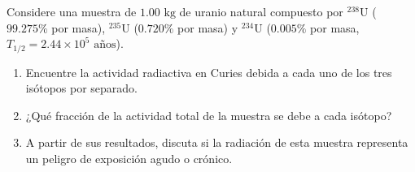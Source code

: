 \item Considere una muestra de $1.00\text{ kg}$ de uranio natural compuesto por $^{238}\text{U}$ ($99.275\%$ por masa), $^{235}\text{U}$ ($0.720\%$ por masa) y $^{234}\text{U}$ ($0.005\%$ por masa, $T_{1/2} = 2.44 \times 10^5\text{ años}$).
\begin{enumerate}
    \item Encuentre la actividad radiactiva en Curies debida a cada uno de los tres isótopos por separado.
    \item ¿Qué fracción de la actividad total de la muestra se debe a cada isótopo?
    \item A partir de sus resultados, discuta si la radiación de esta muestra representa un peligro de exposición agudo o crónico.
\end{enumerate}